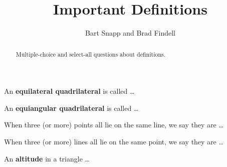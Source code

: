 \documentclass[nooutcomes]{ximera}
\title{Important Definitions}
\author{Bart Snapp and Brad Findell}
\begin{document}
\begin{abstract}
Multiple-choice and select-all questions about definitions. 
\end{abstract}
\maketitle


\begin{question}  
An \textbf{equilateral quadrilateral} is called \dots
\begin{multipleChoice}  
\end{multipleChoice}  
\end{question}

\begin{question}  
An \textbf{equiangular quadrilateral} is called \dots
\begin{multipleChoice}  
\end{multipleChoice}  
\end{question}

\begin{question}  
When three (or more) points all lie on the same line, we say they are \dots
\begin{multipleChoice}  
\end{multipleChoice}  
\end{question}

\begin{question}  
When three (or more) lines all lie on the same point, we say they are \dots
\begin{multipleChoice}  
\end{multipleChoice}  
\end{question}

\begin{question}  
An \textbf{altitude} in a triangle \dots
\begin{multipleChoice}  
\end{multipleChoice}  
\end{question}
\end{document}
